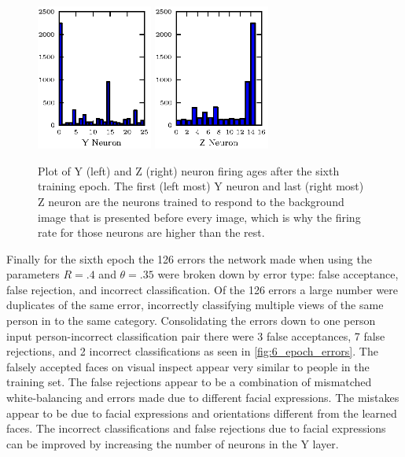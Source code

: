\documentclass[conference]{IEEEtran}
\begin{document}
\begin{figure}
\center
\fontsize{8}{12}\selectfont
\includegraphics[width=1.5in]{figs/epoch_5_y_ages}
\includegraphics[width=1.5in]{figs/epoch_5_z_ages}
\caption{Plot of Y (left) and Z (right) neuron firing ages after the sixth training epoch.  The first (left most) Y neuron and last (right most) Z neuron are the neurons trained to respond to the background image that is presented before every image, which is why the firing rate for those neurons are higher than the rest.}
\label{fig:ages}
\end{figure}

Finally for the sixth epoch the 126 errors the network made when using the parameters $R=.4$ and $\theta=.35$ were broken down by error type: false acceptance, false rejection, and incorrect classification. Of the 126 errors a large number were duplicates of the same error, incorrectly classifying multiple views of the same person in to the same category.  Consolidating the errors down to one person input person-incorrect classification pair there were 3 false acceptances, 7 false rejections, and 2 incorrect classifications as seen in \ref{fig:6_epoch_errors}.  The falsely accepted faces on visual inspect appear very similar to people in the training set.  The false rejections appear to be a combination of mismatched white-balancing and errors made due to different facial expressions.  The mistakes appear to be due to facial expressions and orientations different from the learned faces.  The incorrect classifications and false rejections due to facial expressions can be improved by increasing the number of neurons in the Y layer.
\end{document}
